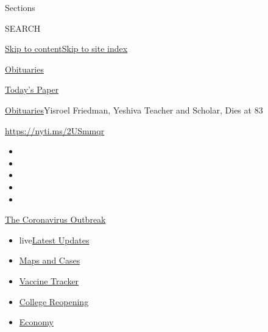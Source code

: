 Sections

SEARCH

\protect\hyperlink{site-content}{Skip to
content}\protect\hyperlink{site-index}{Skip to site index}

\href{https://www.nytimes3xbfgragh.onion/section/obituaries}{Obituaries}

\href{https://myaccount.nytimes3xbfgragh.onion/auth/login?response_type=cookie\&client_id=vi}{}

\href{https://www.nytimes3xbfgragh.onion/section/todayspaper}{Today's
Paper}

\href{/section/obituaries}{Obituaries}\textbar{}Yisroel Friedman,
Yeshiva Teacher and Scholar, Dies at 83

\url{https://nyti.ms/2USmmqr}

\begin{itemize}
\item
\item
\item
\item
\item
\end{itemize}

\href{https://www.nytimes3xbfgragh.onion/news-event/coronavirus?action=click\&pgtype=Article\&state=default\&region=TOP_BANNER\&context=storylines_menu}{The
Coronavirus Outbreak}

\begin{itemize}
\tightlist
\item
  live\href{https://www.nytimes3xbfgragh.onion/2020/08/04/world/coronavirus-covid-19.html?action=click\&pgtype=Article\&state=default\&region=TOP_BANNER\&context=storylines_menu}{Latest
  Updates}
\item
  \href{https://www.nytimes3xbfgragh.onion/interactive/2020/us/coronavirus-us-cases.html?action=click\&pgtype=Article\&state=default\&region=TOP_BANNER\&context=storylines_menu}{Maps
  and Cases}
\item
  \href{https://www.nytimes3xbfgragh.onion/interactive/2020/science/coronavirus-vaccine-tracker.html?action=click\&pgtype=Article\&state=default\&region=TOP_BANNER\&context=storylines_menu}{Vaccine
  Tracker}
\item
  \href{https://www.nytimes3xbfgragh.onion/2020/08/02/us/covid-college-reopening.html?action=click\&pgtype=Article\&state=default\&region=TOP_BANNER\&context=storylines_menu}{College
  Reopening}
\item
  \href{https://www.nytimes3xbfgragh.onion/live/2020/08/03/business/stock-market-today-coronavirus?action=click\&pgtype=Article\&state=default\&region=TOP_BANNER\&context=storylines_menu}{Economy}
\end{itemize}

